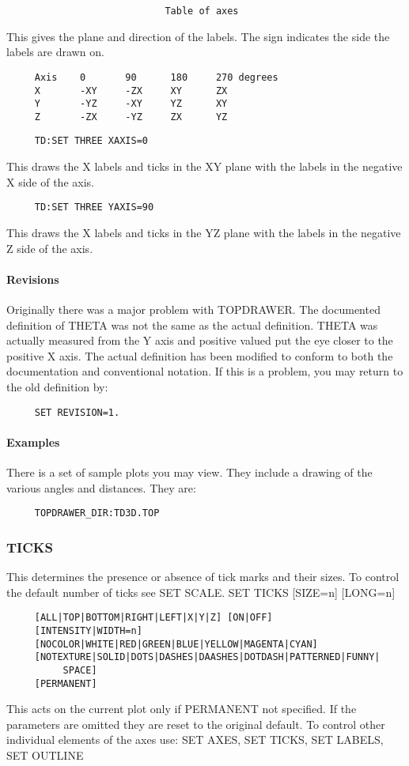 \begin{verbatim}
                            Table of axes
\end{verbatim}

This gives the plane and direction of the labels.  The sign indicates
the side the labels are drawn on.  
\begin{verbatim}
     Axis    0       90      180     270 degrees
     X       -XY     -ZX     XY      ZX
     Y       -YZ     -XY     YZ      XY
     Z       -ZX     -YZ     ZX      YZ
\end{verbatim}

\begin{verbatim}
     TD:SET THREE XAXIS=0 
\end{verbatim}
This  draws the X labels and ticks in the XY plane with the labels in
the negative X side of the axis.  

\begin{verbatim}
     TD:SET THREE YAXIS=90 
\end{verbatim}
This  draws the X labels and ticks in the YZ plane with the labels in
the negative Z side of the axis.  
\paragraph{Revisions}
Originally  there was a major problem with TOPDRAWER.  The documented
definition of THETA was not the same as the actual definition.  THETA
was actually measured from the Y axis and positive valued put the eye
closer to the positive  X  axis.   The  actual  definition  has  been
modified  to  conform  to  both  the  documentation  and conventional
notation.  If this is a problem, you may return to the old definition
by:  
\begin{verbatim}
     SET REVISION=1.  
\end{verbatim}
\paragraph{Examples}
There  is a set of sample plots you may view.  They include a drawing
of the various angles and distances.  They are:  
\begin{verbatim}
     TOPDRAWER_DIR:TD3D.TOP 
\end{verbatim}
\subsubsection{TICKS}
This  determines the presence or absence of tick marks and their sizes.
To control the default number of ticks see SET SCALE.  
SET TICKS [SIZE=n] [LONG=n] 
\begin{verbatim}
     [ALL|TOP|BOTTOM|RIGHT|LEFT|X|Y|Z] [ON|OFF] 
     [INTENSITY|WIDTH=n] 
     [NOCOLOR|WHITE|RED|GREEN|BLUE|YELLOW|MAGENTA|CYAN] 
     [NOTEXTURE|SOLID|DOTS|DASHES|DAASHES|DOTDASH|PATTERNED|FUNNY|
          SPACE] 
     [PERMANENT] 
\end{verbatim}
This  acts on the current plot only if PERMANENT not specified.  If the
parameters are omitted they are reset  to  the  original  default.   To
control other individual elements of the axes use:  
SET AXES, SET TICKS, SET LABELS, SET OUTLINE 

